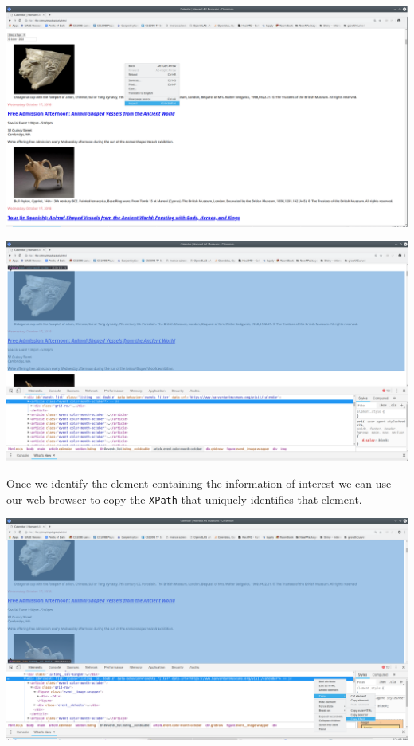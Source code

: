 \documentclass[]{book}
\begin{document}
\includegraphics{Python/PythonWebScrape/images/dev_tools_right_click.png}

\includegraphics{Python/PythonWebScrape/images/dev_tools_inspect.png}

Once we identify the element containing the information of interest we can use our web browser to copy the \texttt{XPath} that uniquely identifies that element.

\includegraphics{Python/PythonWebScrape/images/dev_tools_xpath.png}
\end{document}
